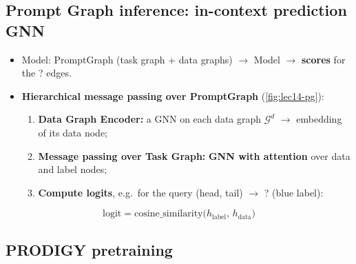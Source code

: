 \subsection{Prompt Graph inference: in-context prediction GNN}\label{sec:lec14-gnn}

\begin{itemize}
  \item Model: PromptGraph (task graph + data graphs) $\to$ Model $\to$ \textbf{scores}
    for the ? edges.
  \item \textbf{Hierarchical message passing over PromptGraph} (\cref{fig:lec14-pg}):
    \begin{enumerate}
      \item \textbf{Data Graph Encoder:} a GNN on each data graph $\mathcal{G}^d$ $\to$
        embedding of its data node;
      \item \textbf{Message passing over Task Graph:} \textbf{GNN with attention} over data
        and label nodes;
      \item \textbf{Compute logits}, e.g.\ for the query (head, tail) $\to$ ? (blue label):
    \end{enumerate}
\end{itemize}
\begin{equation}\label{eq:lec14-logit}
  \mathrm{logit} = \mathrm{cosine\_similarity}\big(h_{\mathrm{label}},\, h_{\mathrm{data}}\big)
\end{equation}

\subsection{PRODIGY pretraining}\label{sec:lec14-pretrain}

